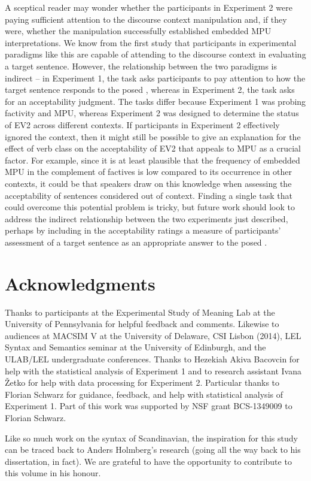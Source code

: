 \documentclass[output=paper]{langsci/langscibook}
\begin{document}
A sceptical reader may wonder whether the participants in Experiment 2 were paying sufficient attention to the discourse context manipulation and, if they were, whether the manipulation successfully established embedded MPU interpretations.  We know from the first study that participants in experimental paradigms like this are capable of attending to the discourse context in evaluating a target sentence.  However, the relationship between the two paradigms is indirect -- in Experiment 1, the task asks participants to pay attention to how the target sentence responds to the posed , whereas in Experiment 2, the task asks for an acceptability judgment.  The tasks differ because Experiment 1 was probing factivity and MPU, whereas Experiment 2 was designed to determine the status of EV2 across different contexts.   If participants in Experiment 2 effectively ignored the  context, then it might still be possible to give an explanation for the effect of verb class on the acceptability of EV2 that appeals to MPU as a crucial factor. For example, since it is at least plausible that the frequency of embedded MPU in the complement of factives is low compared to its occurrence in other contexts, it could be that speakers draw on this knowledge when assessing the acceptability of sentences considered out of context. 
Finding a single task that could overcome this potential problem is tricky, but future work should look to address the indirect relationship between the two experiments just described, perhaps by including in the acceptability ratings a measure of participants' assessment of a target sentence as an appropriate answer to the posed .


\section*{Acknowledgments} 

Thanks to participants at the Experimental Study of Meaning Lab at the University of Pennsylvania for helpful feedback and comments. Likewise to audiences at MACSIM V at the University of Delaware, CSI Lisbon (2014), LEL Syntax and Semantics seminar at the University of Edinburgh, and the ULAB/LEL undergraduate conferences. Thanks to Hezekiah Akiva Bacovcin for help with the statistical analysis of Experiment 1 and to research assistant Ivana \v{Z}etko for help with data processing for Experiment 2. Particular thanks to Florian Schwarz for guidance, feedback, and help with statistical analysis of Experiment 1. Part of this work was supported by NSF grant BCS-1349009 to Florian Schwarz.

Like so much work on the syntax of {Scandinavian}, the inspiration for this study can be traced back to Anders Holmberg’s research (going all the way back to his dissertation, in fact).  We are grateful to have the opportunity to contribute to this volume in his honour.
	
{\sloppy
\printbibliography[heading=subbibliography,notkeyword=this]
}
\end{document}
